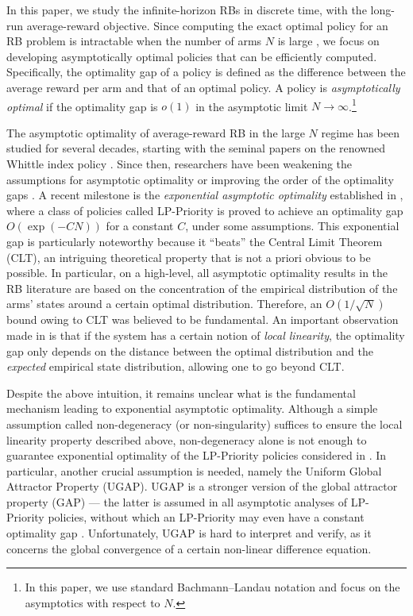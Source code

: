 \documentclass[11pt,letterpaper]{article}
\theoremstyle{plain}
\theoremstyle{definition}
\theoremstyle{remark}
\begin{document}
In this paper, we study the infinite-horizon RBs in discrete time, with the long-run average-reward objective. 
Since computing the exact optimal policy for an RB problem is intractable when the number of arms $N$ is large \citep{PapTsi_99_pspace}, we focus on developing asymptotically optimal policies that can be efficiently computed. 
Specifically, the optimality gap of a policy is defined as the difference between the average reward per arm and that of an optimal policy. 
A policy is \emph{asymptotically optimal} if the optimality gap is $o(1)$ in the asymptotic limit $N\to\infty$.\footnote{In this paper, we use standard Bachmann–Landau notation and focus on the asymptotics with respect to $N$.} 


The asymptotic optimality of average-reward RB in the large $N$ regime has been studied for several decades, starting with the seminal papers on the renowned Whittle index policy \citep{Whi_88_rb,WebWei_90}. 
Since then, researchers have been weakening the assumptions for asymptotic optimality \citep{Ver_16_verloop,HonXieCheWan_23,HonXieCheWan_24,Yan_24_multichain} or improving the order of the optimality gaps \citep{GasGauYan_23_exponential,GasGauYan_23_whittles}. 
A recent milestone is the \emph{exponential asymptotic optimality} established in \cite{GasGauYan_23_exponential,GasGauYan_23_whittles}, where a class of policies called LP-Priority is proved to achieve an optimality gap  $O(\exp(-CN))$ for a constant $C$, under some assumptions. 
This exponential gap is particularly noteworthy because it ``beats'' the Central Limit Theorem (CLT), an intriguing theoretical property that is not a priori obvious to be possible. 
In particular, on a high-level, all asymptotic optimality results in the RB literature are based on the concentration of the empirical distribution of the arms' states around a certain optimal distribution. Therefore, an $O(1/\sqrt{N})$ bound owing to CLT was believed to be fundamental. 
An important observation made in \cite{GasGauYan_23_exponential,GasGauYan_23_whittles} is that if the system has a certain notion of \emph{local linearity},  the optimality gap only depends on the distance between the optimal distribution and the \emph{expected} empirical state distribution, allowing one to go beyond CLT. 

Despite the above intuition,
it remains unclear what is the fundamental mechanism leading to exponential asymptotic optimality. Although a simple assumption called non-degeneracy (or non-singularity) suffices to ensure the local linearity property described above, non-degeneracy alone is not enough to guarantee exponential optimality of the LP-Priority policies considered in \cite{GasGauYan_23_exponential,GasGauYan_23_whittles}.
In particular, another crucial assumption is needed, namely the Uniform Global Attractor Property (UGAP). 
UGAP is a stronger version of the global attractor property (GAP) --- the latter is assumed in all asymptotic analyses of LP-Priority policies, without which an LP-Priority may even have a constant optimality gap  \citep[see][for concrete examples]{WebWei_90,GasGauYan_20_whittles,HonXieCheWan_23}. 
Unfortunately, UGAP is hard to interpret and verify, as it concerns the global convergence of a certain non-linear difference equation. 
\end{document}
